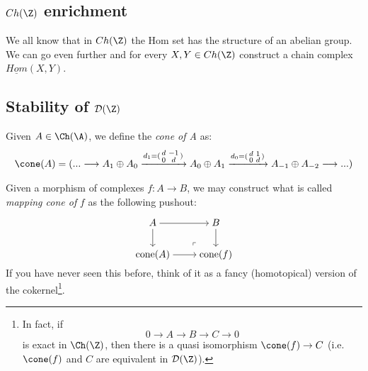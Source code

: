\subsection{$Ch(\Z)$ enrichment}
We all know that in $Ch(\Z)$ the Hom set has the structure of an abelian group. We can go even further and for every $X,Y\in Ch(\Z)$ construct a chain complex $\underline{Hom}(X,Y)$.


\subsection{Stability of $\mathcal{D(\Z)}$}





\begin{definition}
    Given $A\in\Ch(\A)$, we define the \textit{cone of A} as:
    \begin{align*}
       \cone(A) =(...\longrightarrow A_1\oplus A_0\xrightarrow{d_1=(\begin{smallmatrix}
        d&-1\\
        0 &d
    \end{smallmatrix})}A_0\oplus A_1 \xrightarrow{d_0=(\begin{smallmatrix}
        d&1\\
        0 &d
    \end{smallmatrix})} A_{-1}\oplus A_{-2}\longrightarrow...)
    \end{align*}
\end{definition}



Given a morphism of complexes $f: A\to B$, we may construct what is called \emph{mapping cone of} $f$ as the following pushout:

\[
\begin{tikzcd}[cramped,sep=small]
	A && B \\
	\\
	{\operatorname{cone}(A)} && {\operatorname{cone}(f)}
	\arrow[from=1-1, to=1-3]
	\arrow[from=1-1, to=3-1]
	\arrow[from=1-3, to=3-3]
	\arrow[from=3-1, to=3-3]
	\arrow["\lrcorner"{anchor=center, pos=0.125, rotate=180}, draw=none, from=3-3, to=1-1]
\end{tikzcd}\]
If you have never seen this before, think of it as a fancy (homotopical) version of the cokernel\footnote{In fact, if
    \[0\to A\to B\to C\to 0\]
    is exact in $\Ch(\Z)$, then there is a quasi isomorphism $\cone(f)\to C$ (i.e. $\cone(f)$ and $C$ are equivalent in $\mathcal{D}(\Z)$). }.





